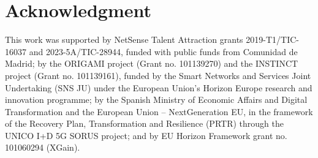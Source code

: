 \documentclass[10pt, conference, letterpaper]{IEEEtran}
\begin{document}
\section*{Acknowledgment}
This work was supported by NetSense Talent Attraction grants 2019-T1/TIC-16037 and 2023-5A/TIC-28944, funded with public funds from Comunidad de Madrid; 
by the ORIGAMI project (Grant no. 101139270) and the INSTINCT project (Grant no. 101139161), funded by the Smart Networks and Services Joint Undertaking (SNS JU) under the European Union’s Horizon Europe research and innovation programme;
by the Spanish Ministry of Economic Affairs and Digital Transformation and the European Union – NextGeneration EU, in the framework of the Recovery Plan, Transformation and Resilience (PRTR) through the UNICO I+D 5G SORUS project; 
and by EU Horizon Framework grant no. 101060294 (XGain).

\newpage
\balance


\end{document}
